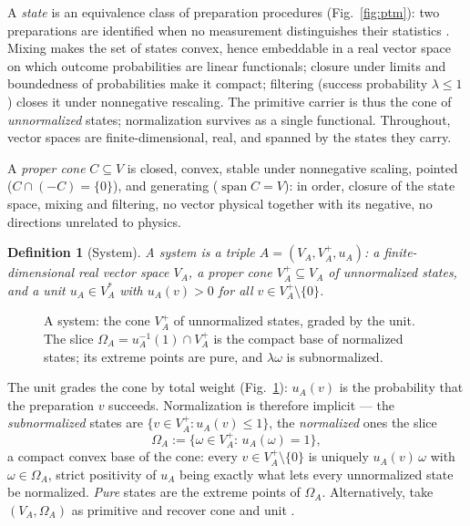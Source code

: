 \documentclass[prl,aps,10pt,superscriptaddress, floatfix]{revtex4-2}
\newtheorem*{defi}{Definition}
\begin{document}
A \emph{state} is an equivalence class of preparation procedures (Fig.~\ref{fig:ptm}): two preparations are identified when no measurement distinguishes their statistics \cite{Mueller2021}. Mixing makes the set of states convex, hence embeddable in a real vector space on which outcome probabilities are linear functionals; closure under limits and boundedness of probabilities make it compact; filtering (success probability $\lambda\le1$) closes it under nonnegative rescaling. The primitive carrier is thus the cone of \emph{unnormalized} states; normalization survives as a single functional. Throughout, vector spaces are finite-dimensional, real, and spanned by the states they carry.

A \emph{proper cone} $C\subseteq V$ is closed, convex, stable under nonnegative scaling, pointed ($C\cap(-C)=\{0\}$), and generating ($\operatorname{span}C=V$): in order, closure of the state space, mixing and filtering, no vector physical together with its negative, no directions unrelated to physics.

\begin{defi}[System]
A \emph{system} is a triple $A=(V_A,V_A^+,u_A)$: a finite-dimensional real vector space $V_A$, a proper cone $V_A^+\subseteq V_A$ of \emph{unnormalized states}, and a \emph{unit} $u_A\in V_A^*$ with $u_A(v)>0$ for all $v\in V_A^+\setminus\{0\}$.
\end{defi}

\begin{figure}[t]
\centering
{}
\caption{A system: the cone $V_A^+$ of unnormalized states, graded by the unit. The slice $\Omega_A=u_A^{-1}(1)\cap V_A^+$ is the compact base of normalized states; its extreme points are pure, and $\lambda\omega$ is subnormalized.}
\label{fig:cone}
\end{figure}

The unit grades the cone by total weight (Fig.~\ref{fig:cone}): $u_A(v)$ is the probability that the preparation $v$ succeeds. Normalization is therefore implicit --- the \emph{subnormalized} states are $\{v\in V_A^+:u_A(v)\le1\}$, the \emph{normalized} ones the slice
\[
\Omega_A:=\{\omega\in V_A^+:\,u_A(\omega)=1\},
\]
a compact convex base of the cone: every $v\in V_A^+\setminus\{0\}$ is uniquely $u_A(v)\,\omega$ with $\omega\in\Omega_A$, strict positivity of $u_A$ being exactly what lets every unnormalized state be normalized. \emph{Pure} states are the extreme points of $\Omega_A$. Alternatively, take $(V_A,\Omega_A)$ as primitive and recover cone and unit \cite{Mueller2021}.
\end{document}
